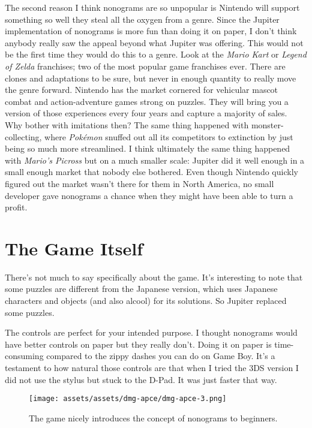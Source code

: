 \documentclass{book}
\begin{document}
The second reason I think nonograms are so unpopular is Nintendo will support something so well they steal all the oxygen from a genre. Since the Jupiter implementation of nonograms is more fun than doing it on paper, I don’t think anybody really saw the appeal beyond what Jupiter was offering. This would not be the first time they would do this to a genre. Look at the \emph{Mario Kart} or \emph{Legend of Zelda} franchises; two of the most popular game franchises ever. There are clones and adaptations to be sure, but never in enough quantity to really move the genre forward. Nintendo has the market cornered for vehicular mascot combat and action-adventure games strong on puzzles. They will bring you a version of those experiences every four years and capture a majority of sales. Why bother with imitations then? The same thing happened with monster-collecting, where \emph{Pokémon} snuffed out all its competitors to extinction by just being so much more streamlined. I think ultimately the same thing happened with \emph{Mario’s Picross} but on a much smaller scale: Jupiter did it well enough in a small enough market that nobody else bothered. Even though Nintendo quickly figured out the market wasn’t there for them in North America, no small developer gave nonograms a chance when they might have been able to turn a profit.

\FloatBarrier\needspace{10mm}\section*{The Game Itself}\nopagebreak[4]

There’s not much to say specifically about the game. It’s interesting to note that some puzzles are different from the Japanese version, which uses Japanese characters and objects (and also alcool) for its solutions. So Jupiter replaced some puzzles.

The controls are perfect for your intended purpose. I thought nonograms would have better controls on paper but they really don’t. Doing it on paper is time-consuming compared to the zippy dashes you can do on Game Boy. It’s a testament to how natural those controls are that when I tried the 3DS version I did not use the stylus but stuck to the D-Pad. It was just faster that way.

\begin{figure}[hbt]
\vskip 10pt
\centering \texttt{[image: assets/assets/dmg-apce/dmg-apce-3.png]}\par\pagetwodescription The game nicely introduces the concept of nonograms to beginners.
\vskip 6pt
\end{figure}
\end{document}
